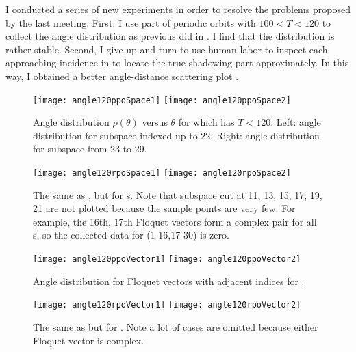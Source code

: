 \begin{description}
I conducted a series of new experiments in order to resolve the
problems proposed by the last meeting. First, I use part of periodic
orbits with $ 100 < T < 120$ to collect the angle distribution as
previous did in . I find that the
distribution is rather stable. Second, I give up {\PoincSec} and turn
to use human labor to inspect each approaching incidence in
 to locate the true shadowing part
approximately. In this way, I obtained a better angle-distance
scattering plot .
\begin{figure}[h]
  \centering
  \texttt{[image: angle120ppoSpace1]} \hfill
  \texttt{[image: angle120ppoSpace2]}
  \caption{Angle distribution $\rho(\theta)$ versus $\theta$
    for  which has $ T < 120$.
    Left: angle distribution for subspace indexed up to 22.
    Right: angle distribution for subspace from 23 to 29.
  }
  \label{fig:angDist_ppo}
\end{figure}
\begin{figure}[h]
  \centering
  \texttt{[image: angle120rpoSpace1]} \hfill
  \texttt{[image: angle120rpoSpace2]}
  \caption{The same as , but for s.
  Note that subspace cut at 11, 13, 15, 17, 19, 21 are not plotted
  because the sample points are very few. For example, the 16th, 17th
  Floquet vectors form a complex pair
  for all s, so the collected
  data for (1-16,17-30) is zero.}
  \label{fig:angDist_rpo}
\end{figure}
\begin{figure}[h]
  \centering
  \texttt{[image: angle120ppoVector1]} \hfill
  \texttt{[image: angle120ppoVector2]}
  \caption{ Angle distribution for Floquet vectors with adjacent
    indices for .
  }
  \label{fig:angDistVec_ppo}
\end{figure}
\begin{figure}[h]
  \centering
  \texttt{[image: angle120rpoVector1]} \hfill
  \texttt{[image: angle120rpoVector2]}
  \caption{The same as  but for .
  Note a lot of cases are omitted because either Floquet vector is
  complex.
}
  \label{fig:angDistVec_rpo}
\end{figure}


\end{description}
